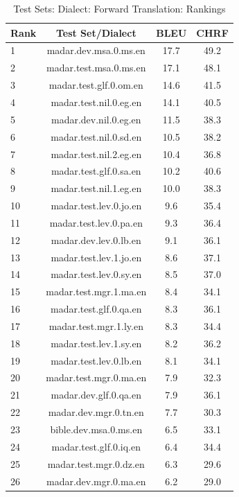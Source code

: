 \begin{table}[htbp]
\centering
\caption{Test Sets: Dialect: Forward Translation: Rankings}
\label{tab:testset_ranking_forward_dialect}
\begin{tabular}{l@{\hspace{3pt}}c@{\hspace{3pt}}c@{\hspace{3pt}}c}
\toprule
Rank & Test Set/Dialect & BLEU & CHRF \\
\midrule
1 & madar.dev.msa.0.ms.en & 17.7 & 49.2 \\
2 & madar.test.msa.0.ms.en & 17.1 & 48.1 \\
3 & madar.test.glf.0.om.en & 14.6 & 41.5 \\
4 & madar.test.nil.0.eg.en & 14.1 & 40.5 \\
5 & madar.dev.nil.0.eg.en & 11.5 & 38.3 \\
6 & madar.test.nil.0.sd.en & 10.5 & 38.2 \\
7 & madar.test.nil.2.eg.en & 10.4 & 36.8 \\
8 & madar.test.glf.0.sa.en & 10.2 & 40.6 \\
9 & madar.test.nil.1.eg.en & 10.0 & 38.3 \\
10 & madar.test.lev.0.jo.en & 9.6 & 35.4 \\
11 & madar.test.lev.0.pa.en & 9.3 & 36.4 \\
12 & madar.dev.lev.0.lb.en & 9.1 & 36.1 \\
13 & madar.test.lev.1.jo.en & 8.6 & 37.1 \\
14 & madar.test.lev.0.sy.en & 8.5 & 37.0 \\
15 & madar.test.mgr.1.ma.en & 8.4 & 34.1 \\
16 & madar.test.glf.0.qa.en & 8.3 & 36.1 \\
17 & madar.test.mgr.1.ly.en & 8.3 & 34.4 \\
18 & madar.test.lev.1.sy.en & 8.2 & 36.2 \\
19 & madar.test.lev.0.lb.en & 8.1 & 34.1 \\
20 & madar.test.mgr.0.ma.en & 7.9 & 32.3 \\
21 & madar.dev.glf.0.qa.en & 7.9 & 36.1 \\
22 & madar.dev.mgr.0.tn.en & 7.7 & 30.3 \\
23 & bible.dev.msa.0.ms.en & 6.5 & 33.1 \\
24 & madar.test.glf.0.iq.en & 6.4 & 34.4 \\
25 & madar.test.mgr.0.dz.en & 6.3 & 29.6 \\
26 & madar.dev.mgr.0.ma.en & 6.2 & 29.0 \\

\end{tabular}
\end{table}
